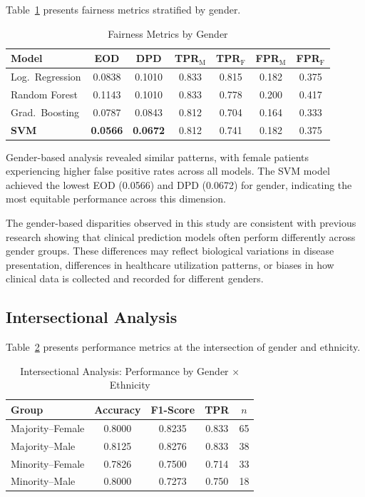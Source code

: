 Table~\ref{tab:gender_fairness} presents fairness metrics stratified by gender.

\begin{table}[H]
\centering
\caption{Fairness Metrics by Gender}
\begin{tabular}{lcccccc}
\toprule
\textbf{Model} & \textbf{EOD} & \textbf{DPD} & 
\textbf{TPR$_{\text{M}}$} & \textbf{TPR$_{\text{F}}$} & 
\textbf{FPR$_{\text{M}}$} & \textbf{FPR$_{\text{F}}$} \\
\midrule
Log.\ Regression & 0.0838 & 0.1010 & 0.833 & 0.815 & 0.182 & 0.375 \\
Random Forest & 0.1143 & 0.1010 & 0.833 & 0.778 & 0.200 & 0.417 \\
Grad.\ Boosting & 0.0787 & 0.0843 & 0.812 & 0.704 & 0.164 & 0.333 \\
\textbf{SVM} & \textbf{0.0566} & \textbf{0.0672} & 0.812 & 0.741 & 0.182 & 0.375 \\
\bottomrule
\end{tabular}
\label{tab:gender_fairness}
\end{table}

Gender-based analysis revealed similar patterns, with female patients 
experiencing higher false positive rates across all models. The SVM model 
achieved the lowest EOD (0.0566) and DPD (0.0672) for gender, indicating 
the most equitable performance across this dimension.

The gender-based disparities observed in this study are consistent with 
previous research showing that clinical prediction models often perform 
differently across gender groups. These differences may reflect biological 
variations in disease presentation, differences in healthcare utilization 
patterns, or biases in how clinical data is collected and recorded for 
different genders.

\subsection{Intersectional Analysis}

Table~\ref{tab:intersectional} presents performance metrics at the 
intersection of gender and ethnicity.

\begin{table}[H]
\centering
\caption{Intersectional Analysis: Performance by Gender $\times$ Ethnicity}
\begin{tabular}{lcccc}
\toprule
\textbf{Group} & \textbf{Accuracy} & \textbf{F1-Score} & 
\textbf{TPR} & \textbf{$n$} \\
\midrule
Majority--Female & 0.8000 & 0.8235 & 0.833 & 65 \\
Majority--Male & 0.8125 & 0.8276 & 0.833 & 38 \\
Minority--Female & 0.7826 & 0.7500 & 0.714 & 33 \\
Minority--Male & 0.8000 & 0.7273 & 0.750 & 18 \\
\bottomrule
\end{tabular}
\label{tab:intersectional}
\end{table}

